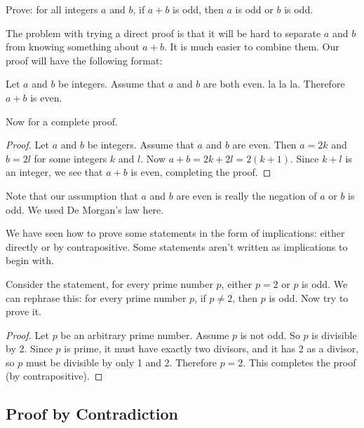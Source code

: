 \documentclass[12pt]{article}
\begin{document}
 
  \begin{example} 
   Prove: for all integers $a$ and $b$, if $a + b$ is odd, then $a$ is odd or $b$ is odd.  
   \begin{solution}
     The problem with trying a direct proof is that it will be hard to separate $a$ and $b$ from knowing something about $a+b$.  It is much easier to combine them.  Our proof will have the following format:
     
     Let $a$ and $b$ be integers.  Assume that $a$ and $b$ are both even.  la la la.  Therefore $a+b$ is even.
     
     Now for a complete proof.
     \begin{proof}
       Let $a$ and $b$ be integers.  Assume that $a$ and $b$ are even.  Then $a = 2k$ and $b = 2l$ for some integers $k$ and $l$.  Now $a + b = 2k + 2l = 2(k+1)$.  Since $k + l$ is an integer, we see that $a + b$ is even, completing the proof.
     \end{proof}
     
     Note that our assumption that $a$ and $b$ are even is really the negation of $a$ or $b$ is odd.  We used De Morgan's law here.
   \end{solution}
 \end{example}
 
 
We have seen how to prove some statements in the form of implications: either directly or by contrapositive.  Some statements aren't written as implications to begin with.
   
  \begin{example}
    Consider the statement, for every prime number $p$, either $p = 2$ or $p$ is odd.  We can rephrase this: for every prime number $p$, if $p \ne 2$, then $p$ is odd.  Now try to prove it.
    
    \begin{proof}
     Let $p$ be an arbitrary prime number.  Assume $p$ is not odd.  So $p$ is divisible by 2.  Since $p$ is prime, it must have exactly two divisors, and it has 2 as a divisor, so $p$ must be divisible by only 1 and 2.  Therefore $p = 2$.  This completes the proof (by contrapositive). 
    \end{proof}
 
  \end{example} 
 
 
 
 
\subsection*{Proof by Contradiction}  
\end{document}
